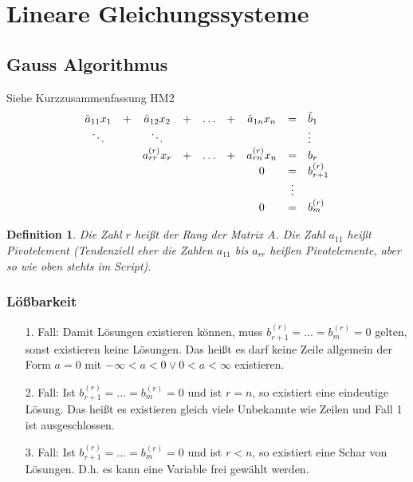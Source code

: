\documentclass[12pt,a4paper]{article}%
\newtheorem{definition}[satz]{Definition}
\numberwithin{equation}{section}
\numberwithin{equation}{subsection}
\begin{document}
\section{Lineare Gleichungssysteme}
  \subsection{Gauss Algorithmus}
  Siehe Kurzzusammenfassung HM2
  \begin{align}
	     \begin{array}{c c c c c c c c l}
	       \tilde{a}_{11} x_1 & + & \tilde{a}_{12} x_2 & + & \dots & + & \tilde{a}_{1n} x_n & = &  \tilde{b}_1 \\
	       \ddots &\;& \ddots &\;&\;&\;&\;&\;&\vdots\\
	       \; & \; & a^{(r)}_{rr}x_r &+& \dots &+& a^{(r)}_{rn}x_n &=& b_r\\
	       &\;&\;&\;&\;&\;& 0 & = & b^{(r)}_{r+1}\\
	       &\;&\;&\;&\;&\;& \; & \vdots & \;\\
	       &\;&\;&\;&\;&\;& 0 & = & b^{(r)}_{m}
	     \end{array}
	\end{align}
	\begin{definition}
	  Die Zahl $r$ heißt der Rang der Matrix A. Die Zahl $a_{11}$ heißt Pivotelement (Tendenziell eher die Zahlen $a_{11}$ bis $a_{rr}$ heißen Pivotelemente, aber so wie oben stehts im Script). 
	\end{definition}
	
	\subsubsection{Lößbarkeit}
	\begin{itemize}
	  \item[1. Fall: ]
	  Damit Lösungen existieren können, muss $b^{(r)}_{r+1} = ... = b^{(r)}_{m} = 0$ gelten, sonst existieren keine Lösungen. Das heißt es darf keine Zeile allgemein der Form $a = 0$ mit $-\infty < a < 0 \lor 0 < a < \infty$ existieren.
	  \item[2. Fall: ]
	    Ist $b^{(r)}_{r+1} = ... = b^{(r)}_{m} = 0$ und ist $r = n$, so existiert eine eindeutige Lösung. Das heißt es existieren gleich viele Unbekannte wie Zeilen und Fall 1 ist ausgeschlossen.
    \item[3. Fall: ]
    Ist $b^{(r)}_{r+1} = ... = b^{(r)}_{m} = 0$ und ist $r < n$, so existiert eine Schar von Lösungen. D.h. es kann eine Variable frei gewählt werden.
  \end{itemize}
	\newpage
	
\end{document}
